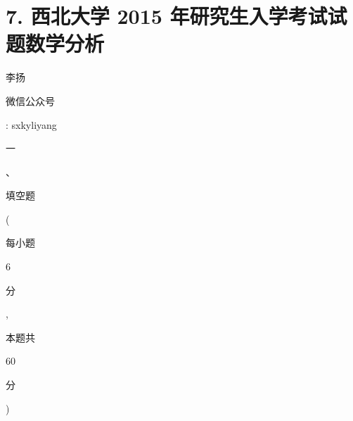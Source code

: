 \documentclass[10pt]{article}
\begin{document}
\section{7. 西北大学 2015 年研究生入学考试试题数学分析}
\begin{CJK}{UTF8}{mj}李扬\end{CJK}

\begin{CJK}{UTF8}{mj}微信公众号\end{CJK}: sxkyliyang

\begin{CJK}{UTF8}{mj}一\end{CJK}、\begin{CJK}{UTF8}{mj}填空题\end{CJK} (\begin{CJK}{UTF8}{mj}每小题\end{CJK} 6 \begin{CJK}{UTF8}{mj}分\end{CJK}, \begin{CJK}{UTF8}{mj}本题共\end{CJK} 60 \begin{CJK}{UTF8}{mj}分\end{CJK})
\end{document}
